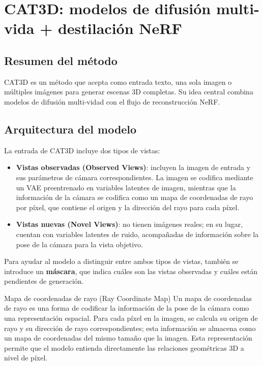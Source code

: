 \section{CAT3D: modelos de difusión multi-vida + destilación NeRF}

\subsection{Resumen del método}

CAT3D es un método que acepta como entrada texto, una sola imagen o múltiples imágenes para generar escenas 3D completas. Su idea central combina modelos de difusión multi-vidad con el flujo de reconstrucción NeRF.

\subsection{Arquitectura del modelo}

La entrada de CAT3D incluye dos tipos de vistas:

\begin{itemize}
    \item \textbf{Vistas observadas (Observed Views)}: incluyen la imagen de entrada y sus parámetros de cámara correspondientes. La imagen se codifica mediante un VAE preentrenado en variables latentes de imagen, mientras que la información de la cámara se codifica como un mapa de coordenadas de rayo por píxel, que contiene el origen y la dirección del rayo para cada píxel.
    \item \textbf{Vistas nuevas (Novel Views)}: no tienen imágenes reales; en su lugar, cuentan con variables latentes de ruido, acompañadas de información sobre la pose de la cámara para la vista objetivo.
\end{itemize}

Para ayudar al modelo a distinguir entre ambos tipos de vistas, también se introduce un \textbf{máscara}, que indica cuáles son las vistas observadas y cuáles están pendientes de generación.

\begin{knowledgebox}{Mapa de coordenadas de rayo (Ray Coordinate Map)}
Un mapa de coordenadas de rayo es una forma de codificar la información de la pose de la cámara como una representación espacial. Para cada píxel en la imagen, se calcula su origen de rayo y su dirección de rayo correspondientes; esta información se almacena como un mapa de coordenadas del mismo tamaño que la imagen. Esta representación permite que el modelo entienda directamente las relaciones geométricas 3D a nivel de píxel.
\end{knowledgebox}

